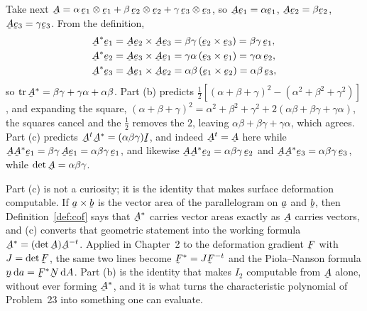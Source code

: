 \begin{solution}
Take next $\bA=\alpha\,\be_{1}\otimes\be_{1}+\beta\,\be_{2}\otimes\be_{2}
+\gamma\,\be_{3}\otimes\be_{3}$, so $\bA\be_{1}=\alpha\be_{1}$,
$\bA\be_{2}=\beta\be_{2}$, $\bA\be_{3}=\gamma\be_{3}$. From the definition,
\[
\begin{aligned}
   \bA^{*}\be_{1}&=\bA\be_{2}\times\bA\be_{3}
    =\beta\gamma\,(\be_{2}\times\be_{3})=\beta\gamma\,\be_{1},\\
   \bA^{*}\be_{2}&=\bA\be_{3}\times\bA\be_{1}
    =\gamma\alpha\,(\be_{3}\times\be_{1})=\gamma\alpha\,\be_{2},\\
   \bA^{*}\be_{3}&=\bA\be_{1}\times\bA\be_{2}
    =\alpha\beta\,(\be_{1}\times\be_{2})=\alpha\beta\,\be_{3},
\end{aligned}
\]
so $\tr\bA^{*}=\beta\gamma+\gamma\alpha+\alpha\beta$. Part (b) predicts
$\tfrac12[(\alpha+\beta+\gamma)^{2}-(\alpha^{2}+\beta^{2}+\gamma^{2})]$, and
expanding the square,
$(\alpha+\beta+\gamma)^{2}=\alpha^{2}+\beta^{2}+\gamma^{2}
+2(\alpha\beta+\beta\gamma+\gamma\alpha)$, the squares cancel and the
$\tfrac12$ removes the $2$, leaving
$\alpha\beta+\beta\gamma+\gamma\alpha$, which agrees. Part (c) predicts
$\bA^{t}\bA^{*}=(\alpha\beta\gamma)\I$, and indeed $\bA^{t}=\bA$ here while
$\bA\bA^{*}\be_{1}=\beta\gamma\,\bA\be_{1}=\alpha\beta\gamma\,\be_{1}$, and
likewise $\bA\bA^{*}\be_{2}=\alpha\beta\gamma\,\be_{2}$ and
$\bA\bA^{*}\be_{3}=\alpha\beta\gamma\,\be_{3}$, while
$\det\bA=\alpha\beta\gamma$.
\end{solution}

\begin{remark}\label{rem:cofuse}
Part (c) is not a curiosity; it is the identity that makes surface
deformation computable. If $\ba\times\bb$ is the vector area of the
parallelogram on $\ba$ and $\bb$, then Definition~\ref{def:cof} says that
$\bA^{*}$ carries vector areas exactly as $\bA$ carries vectors, and (c)
converts that geometric statement into the working formula
$\bA^{*}=(\det\bA)\bA^{-t}$. Applied in Chapter~2 to the deformation
gradient $\bF$ with $J=\det\bF$, the same two lines become
$\bF^{*}=J\bF^{-t}$ and the Piola--Nanson formula
$\bn\,\dl a=\bF^{*}\bN\,\dl A$. Part (b) is the identity that makes
$I_{2}$ computable from $\bA$ alone, without ever forming $\bA^{*}$, and it
is what turns the characteristic polynomial of Problem~23 into something
one can evaluate.
\end{remark}

